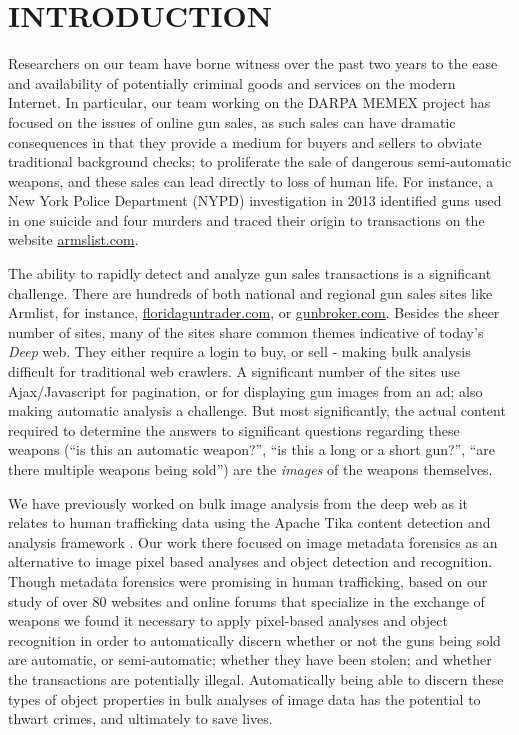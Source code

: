 \section{INTRODUCTION}

Researchers on our team have borne witness over the past two years to the ease and availability of potentially criminal goods and services on the modern Internet. In particular, our team working on the DARPA MEMEX project has focused on the issues of online gun sales, as such sales can have dramatic consequences in that they provide a medium for buyers and sellers to obviate traditional background checks; to proliferate the sale of dangerous semi-automatic weapons, and these sales can lead directly to loss of human life. For instance, a New York Police Department (NYPD) investigation in 2013 identified guns used in one suicide and four murders and traced their origin to transactions on the website \url{armslist.com}\cite{raja_2016}. 

The ability to rapidly detect and analyze gun sales transactions is a significant challenge. There are hundreds of both national and regional gun sales sites like Armlist, for instance, \url{floridaguntrader.com}, or \url{gunbroker.com}. Besides the sheer number of sites, many of the sites share common themes indicative of today's {\em Deep} web. They either require a login to buy, or sell - making bulk analysis difficult for traditional web crawlers. A significant number of the sites use Ajax/Javascript for pagination, or for displaying gun images from an ad; also making automatic analysis a challenge. But most significantly, the actual content required to determine the answers to significant questions regarding these weapons (``is this an automatic weapon?'', ``is this a long or a short gun?'', ``are there multiple weapons being sold'') are the {\em images} of the weapons themselves. 

We have previously worked on bulk image analysis from the deep web as it relates to human trafficking data \cite{mattmann7tg} using the Apache Tika content detection and analysis framework \cite{mattmann2011tika}. Our work there focused on image metadata forensics as an alternative to image pixel based analyses and object detection and recognition. Though metadata forensics were promising in human trafficking, based on our study of over 80 websites and online forums that specialize in the exchange of weapons we found it necessary to apply pixel-based analyses and object recognition in order to automatically discern whether or not the guns being sold are automatic, or semi-automatic; whether they have been stolen; and whether the transactions are potentially illegal. Automatically being able to discern these types of object properties in bulk analyses of image data has the potential to thwart crimes, and ultimately to save lives.

